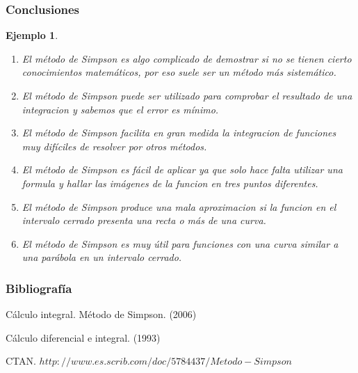\documentclass{beamer}
\newtheorem{ejemplo}{Ejemplo}
\begin{document}
\begin{frame}
\frametitle{Conclusiones}

\begin{ejemplo}
  \begin{enumerate}
    \item
      El método de Simpson es algo complicado de demostrar si no se tienen cierto conocimientos matemáticos, por eso suele ser un método más sistemático.
      \pause
    \item
      El método de Simpson puede ser utilizado para comprobar el resultado de una integracion y sabemos que el error es mínimo.
      \pause
    \item
      El método de Simpson facilita en gran medida la integracion de funciones muy difíciles de resolver por otros métodos.
      \pause
    \item
      El método de Simpson es fácil de aplicar ya que solo hace falta utilizar una formula y hallar las imágenes de la funcion en tres puntos diferentes.
      \pause
    \item El método de Simpson produce una mala aproximacion si la funcion en el intervalo cerrado presenta una recta o más de una curva.
      \pause
    \item El método de Simpson es muy útil para funciones con una curva similar a una parábola en un intervalo cerrado.
      \pause    
      
  \end{enumerate}
\end{ejemplo}

\end{frame}

\begin{frame}
  \frametitle{Bibliografía}

  \begin{thebibliography}{10}

    \beamertemplatebookbibitems
    Cálculo integral. Método de Simpson. 
    (2006) 

    \beamertemplatebookbibitems
    Cálculo diferencial e integral. 
    (1993) 

    \beamertemplatebookbibitems
    CTAN. {\small $http://www.es.scrib.com/doc/5784437/Metodo-Simpson$}

    

  \end{thebibliography}
\end{frame}


\end{document}
